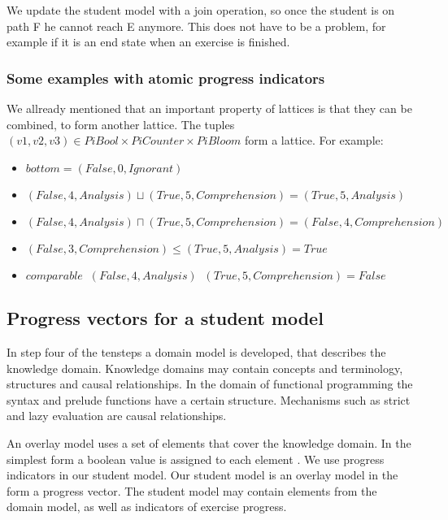 We update the student model with a join operation, so once the student is on path F he cannot reach E anymore.
This does not have to be a problem, for example if it is an end state when an exercise is finished.

\subsubsection{Some examples with atomic progress indicators}

We allready mentioned that an important property of lattices is that they can be combined, to form another lattice.
The tuples $(v1, v2, v3) \in PiBool \times PiCounter \times PiBloom$ form a lattice.
For example:
\begin{itemize}
\item $\mathit{bottom} =  (\mathit{False}, 0, \mathit{Ignorant})$
\item $ (\mathit{False}, 4, \mathit{Analysis})  \sqcup (\mathit{True}, 5, \mathit{Comprehension}) = (\mathit{True}, 5, \mathit{Analysis})$
\item $ (\mathit{False}, 4, \mathit{Analysis})  \sqcap (\mathit{True}, 5, \mathit{Comprehension}) = (\mathit{False}, 4,  \mathit{Comprehension})$
\item $(\mathit{False}, 3, \mathit{Comprehension}) \leq (\mathit{True} , 5, \mathit{Analysis}) = \mathit{True}$
\item $ \mathit{comparable}\; \; (\mathit{False}, 4, \mathit{Analysis})\; \;  (\mathit{True}, 5, \mathit{Comprehension}) = \mathit{False}$
\end{itemize}


\subsection{Progress vectors for a student model}
\label{pv4sm}

In step four of the  \gls{tensteps} a domain model is developed,  that describes the knowledge domain.
Knowledge domains may contain concepts and terminology, structures and causal relationships.
In the domain of functional programming the syntax and prelude functions have a certain structure.
Mechanisms such as strict and lazy evaluation are causal relationships.   

An overlay model uses a set of elements that cover the knowledge domain.
In the simplest form a boolean value is assigned to each element \citep{brusilovskiy_1993}.
We use progress indicators in our student model. 
Our student model is an overlay model in the form a progress vector.
The student model may contain elements from the domain model, as well as indicators of exercise progress.


